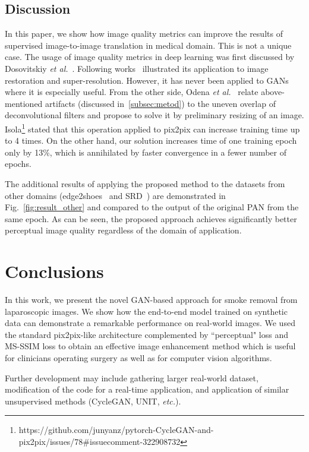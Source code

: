 \documentclass[pmlr]{jmlr}
\begin{document}
\subsection{Discussion} 
In this paper, we show how image quality metrics can improve the results of supervised image-to-image translation in medical domain. This is not a unique case. The usage of image quality metrics in deep learning was first discussed by Dosovitskiy \textit{et al.}~\citep{dosovitskiy2016generating}. Following works~\citep{snell2017learning,zhao2017loss} illustrated its application to image restoration and super-resolution. However, it has never been applied to GANs where it is especially useful. From the other side, Odena \textit{et al.}~\citep{odena2016deconvolution} relate above-mentioned artifacts (discussed in~\ref{subsec:metod}) to the uneven overlap of deconvolutional filters and propose to solve it by preliminary resizing of an image. Isola\footnote{https://github.com/junyanz/pytorch-CycleGAN-and-pix2pix/issues/78\#issuecomment-322908732} stated that this operation applied to pix2pix can increase training time up to 4 times. On the other hand, our solution increases time of one training epoch only by 13\%, which is annihilated by faster convergence in a fewer number of epochs. 

The additional results of applying the proposed method to the datasets from other domains (edge2shoes~\citep{isola2017image} and SRD~\citep{qu2017deshadownet}) are demonstrated in Fig.~\ref{fig:result_other} and compared to the output of the original PAN from the same epoch. As can be seen, the proposed approach achieves significantly better perceptual image quality regardless of the domain of application.



\section{Conclusions}
\label{sec:conclusions}
In this work, we present the novel GAN-based approach for smoke removal from laparoscopic images. We show how the end-to-end model trained on synthetic data can demonstrate a remarkable performance on real-world images. We used the standard pix2pix-like architecture complemented by ``perceptual" loss and MS-SSIM loss to obtain an effective image enhancement method which is useful for clinicians operating surgery as well as for computer vision algorithms.

Further development may include gathering larger real-world dataset, modification of the code for a real-time application, and application of similar unsupervised methods (CycleGAN, UNIT, \emph{etc.}). 










\end{document}
